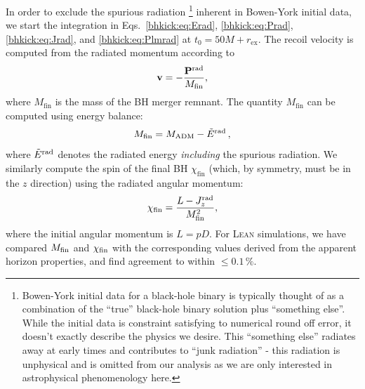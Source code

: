 In order to exclude the spurious radiation
\footnote{
Bowen-York initial data for a black-hole binary is typically thought of as a
combination of the \enquote{true} black-hole binary solution plus \enquote{something else}.
While the initial data is constraint satisfying to numerical round off error, it doesn't
exactly describe the physics we desire. This \enquote{something else} radiates away at early
times and contributes to \enquote{junk radiation} - this radiation is unphysical
and is omitted from our analysis as we are only interested in astrophysical
phenomenology here.}
inherent in Bowen-York initial
data, we start the integration in Eqs.~\eqref{bhkick:eq:Erad}, \eqref{bhkick:eq:Prad},
\eqref{bhkick:eq:Jrad}, and \eqref{bhkick:eq:Plmrad} at $t_0 = 50M + r_{\mathrm{ex}}$. The
recoil velocity is computed from the radiated momentum according to
%
\begin{equation}
    \mathbf{v}=-\frac{\mathbf{P}^{\mathrm{rad}}}{M_{\mathrm{fin}}},
\end{equation}
%
where $M_{\mathrm{fin}}$ is the mass of the BH merger remnant. The
quantity $M_{\mathrm{fin}}$ can be computed using energy balance:
\begin{equation}
    M_{\mathrm{fin}} = M_{\mathrm{ADM}} - \tilde{E}^{\mathrm{rad}}\,,
\end{equation}
where $\tilde{E}^{\rm rad}$ denotes the radiated energy
{\it including} the spurious radiation.
We similarly compute the spin of the final BH $\chi_{\mathrm{fin}}$ (which,
by symmetry, must be in the $z$ direction) using the radiated angular
momentum:
\begin{equation}
    \chi_{\mathrm{fin}} = \frac{L-J^{\mathrm{rad}}_z}{M_{\mathrm{fin}}^2},
\end{equation}
where the initial angular momentum is $L=pD$. For \textsc{Lean} simulations,
we have compared $M_{\rm fin}$ and $\chi_{\rm fin}$ with the
corresponding values derived from the apparent horizon properties,
and find agreement to within $\leq 0.1\,\%$.


